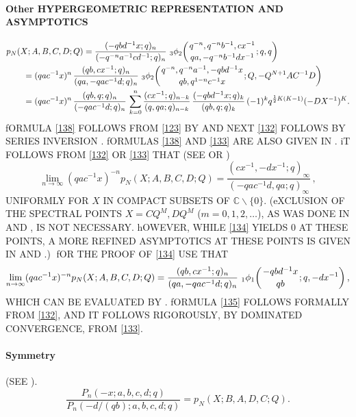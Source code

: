 \documentclass[twoside,11pt]{article}
\newcommand\CC{\mathbb{C}}
\newcommand\half{\frac12}
\newcommand\iy\infty
\newcommand{\qhyp}[5]{\,\mbox{}_{#1}\phi_{#2}\!\left( 
  \genfrac{}{}{0pt}{}{#3}{#4};#5\right)}
\begin{document}
\paragraph{Other HYPERGEOMETRIC REPRESENTATION AND ASYMPTOTICS} 
\begin{align} 
&p_N(X;A,B,C,D;Q) 
=\frac{(-qbd^{-1}x;q)_n}{(-q^{-n}a^{-1}cd^{-1};q)_n}\, 
\qhyp32{q^{-n},q^{-n}b^{-1},cx^{-1}}{qa,-q^{-n}b^{-1}dx^{-1}}{q,q} 
\label{138}\\ 
&\qquad=(qac^{-1}x)^n\,\frac{(qb,cx^{-1};q)_n}{(qa,-qac^{-1}d;q)_n}\, 
\qhyp32{q^{-n},q^{-n}a^{-1},-qbd^{-1}x}{qb,q^{1-n}c^{-1}x} 
{Q,-Q^{N+1}AC^{-1}D} 
\label{132}\\ 
&\qquad=(qac^{-1}x)^n\,\frac{(qb,q;q)_n}{(-qac^{-1}d;q)_n}\, 
\sum_{k=0}^n\frac{(cx^{-1};q)_{n-k}}{(q,qa;q)_{n-k}}\, 
\frac{(-qbd^{-1}x;q)_k}{(qb,q;q)_k}\,(-1)^k q^{\half K(K-1)}(-DX^{-1})^K. 
\label{133} 
\end{align} 
fORMULA \eqref{138} FOLLOWS FROM \eqref{123} BY 
 AND NEXT \eqref{132} FOLLOWS BY SERIES INVERSION 
. 
fORMULAS \eqref{138} AND \eqref{133} ARE ALSO GIVEN IN 
. 
iT FOLLOWS FROM \eqref{132} OR \eqref{133} THAT 
(SEE  OR ) 
\begin{equation} 
\lim_{n\to\iy}(qac^{-1}x)^{-n} p_N(X;A,B,C,D;Q) 
=\frac{(cx^{-1},-dx^{-1};q)_\iy}{(-qac^{-1}d,qa;q)_\iy}\,, 
\label{134} 
\end{equation} 
UNIFORMLY FOR $X$ IN COMPACT SUBSETS OF $\CC\backslash\{0\}$. 
(eXCLUSION OF THE SPECTRAL POINTS $X=CQ^M,DQ^M$ ($m=0,1,2,\ldots$), 
AS WAS DONE IN  AND , IS NOT NECESSARY. hOWEVER, 
WHILE \eqref{134} YIELDS 0 AT THESE POINTS, A MORE REFINED ASYMPTOTICS 
AT THESE POINTS IS GIVEN IN  AND .)$\;$ 
fOR THE PROOF OF \eqref{134} USE THAT 
\begin{equation} 
\lim_{n\to\iy}(qac^{-1}x)^{-n} p_N(X;A,B,C,D;Q) 
=\frac{(qb,cx^{-1};q)_n}{(qa,-qac^{-1}d;q)_n}\, 
\qhyp11{-qbd^{-1}x}{qb}{q,-dx^{-1}}, 
\label{135} 
\end{equation} 
WHICH CAN BE EVALUATED BY . 
fORMULA \eqref{135} FOLLOWS FORMALLY FROM \eqref{132}, AND IT FOLLOWS RIGOROUSLY, BY 
DOMINATED CONVERGENCE, FROM \eqref{133}. 
% 
\paragraph{Symmetry} 
(SEE \cite[\S2.5]{K17}). 
\begin{equation} 
\frac{P_n(-x;a,b,c,d;q)}{P_n(-d/(qb);a,b,c,d;q)} 
=p_N(X;B,A,D,C;Q). 
\end{equation} 
% 
\end{document}

